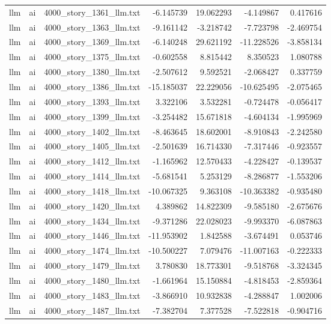 \begin{longtable}{lllrrrr}
llm & ai & 4000\_story\_1361\_llm.txt & -6.145739 & 19.062293 & -4.149867 & 0.417616 \\
llm & ai & 4000\_story\_1363\_llm.txt & -9.161142 & -3.218742 & -7.723798 & -2.469754 \\
llm & ai & 4000\_story\_1369\_llm.txt & -6.140248 & 29.621192 & -11.228526 & -3.858134 \\
llm & ai & 4000\_story\_1375\_llm.txt & -0.602558 & 8.815442 & 8.350523 & 1.080788 \\
llm & ai & 4000\_story\_1380\_llm.txt & -2.507612 & 9.592521 & -2.068427 & 0.337759 \\
llm & ai & 4000\_story\_1386\_llm.txt & -15.185037 & 22.229056 & -10.625495 & -2.075465 \\
llm & ai & 4000\_story\_1393\_llm.txt & 3.322106 & 3.532281 & -0.724478 & -0.056417 \\
llm & ai & 4000\_story\_1399\_llm.txt & -3.254482 & 15.671818 & -4.604134 & -1.995969 \\
llm & ai & 4000\_story\_1402\_llm.txt & -8.463645 & 18.602001 & -8.910843 & -2.242580 \\
llm & ai & 4000\_story\_1405\_llm.txt & -2.501639 & 16.714330 & -7.317446 & -0.923557 \\
llm & ai & 4000\_story\_1412\_llm.txt & -1.165962 & 12.570433 & -4.228427 & -0.139537 \\
llm & ai & 4000\_story\_1414\_llm.txt & -5.681541 & 5.253129 & -8.286877 & -1.553206 \\
llm & ai & 4000\_story\_1418\_llm.txt & -10.067325 & 9.363108 & -10.363382 & -0.935480 \\
llm & ai & 4000\_story\_1420\_llm.txt & 4.389862 & 14.822309 & -9.585180 & -2.675676 \\
llm & ai & 4000\_story\_1434\_llm.txt & -9.371286 & 22.028023 & -9.993370 & -6.087863 \\
llm & ai & 4000\_story\_1446\_llm.txt & -11.953902 & 1.842588 & -3.674491 & 0.053746 \\
llm & ai & 4000\_story\_1474\_llm.txt & -10.500227 & 7.079476 & -11.007163 & -0.222333 \\
llm & ai & 4000\_story\_1479\_llm.txt & 3.780830 & 18.773301 & -9.518768 & -3.324345 \\
llm & ai & 4000\_story\_1480\_llm.txt & -1.661964 & 15.150884 & -4.818453 & -2.859364 \\
llm & ai & 4000\_story\_1483\_llm.txt & -3.866910 & 10.932838 & -4.288847 & 1.002006 \\
llm & ai & 4000\_story\_1487\_llm.txt & -7.382704 & 7.377528 & -7.522818 & -0.904716 \\

\end{longtable}
